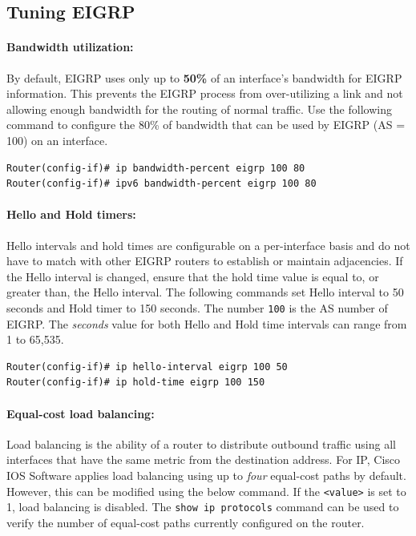 \subsection{Tuning EIGRP}

\paragraph{Bandwidth utilization:} By default, EIGRP uses only up to \textbf{50\%} of an interface's bandwidth for EIGRP information. This prevents the EIGRP process from over-utilizing a link and not allowing enough bandwidth for the routing of normal traffic. Use the following command to configure the 80\% of bandwidth that can be used by EIGRP (AS = 100) on an interface.

\begin{verbatim}
Router(config-if)# ip bandwidth-percent eigrp 100 80
Router(config-if)# ipv6 bandwidth-percent eigrp 100 80
\end{verbatim}

\paragraph{Hello and Hold timers:} Hello intervals and hold times are configurable on a per-interface basis and do not have to match with other EIGRP routers to establish or maintain adjacencies. If the Hello interval is changed, ensure that the hold time value is equal to, or greater than, the Hello interval. The following commands set Hello interval to 50 seconds and Hold timer to 150 seconds. The number \verb|100| is the AS number of EIGRP. \note The \emph{seconds} value for both Hello and Hold time intervals can range from 1 to 65,535. 

\begin{verbatim}
Router(config-if)# ip hello-interval eigrp 100 50
Router(config-if)# ip hold-time eigrp 100 150
\end{verbatim}

\paragraph{Equal-cost load balancing:} Load balancing is the ability of a router to distribute outbound traffic using all interfaces that have the same metric from the destination address. For IP, Cisco IOS Software applies load balancing using up to \emph{four} equal-cost paths by default. However, this can be modified using the below command. If the \verb|<value>| is set to 1, load balancing is disabled.  The \verb|show ip protocols| command can be used to verify the number of equal-cost paths currently configured on the router.

